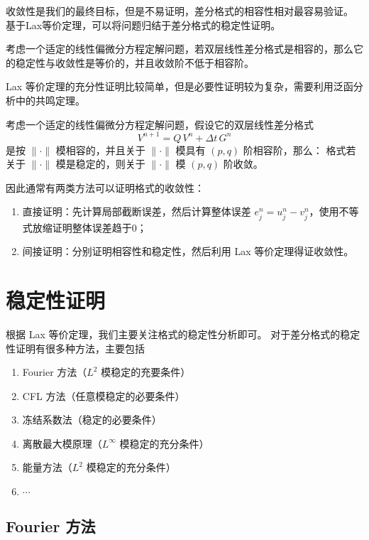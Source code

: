 收敛性是我们的最终目标，但是不易证明，差分格式的相容性相对最容易验证。
基于Lax等价定理，可以将问题归结于差分格式的稳定性证明。

\begin{theorem}
    考虑一个适定的线性偏微分方程定解问题，若双层线性差分格式是相容的，那么它的稳定性与收敛性是等价的，并且收敛阶不低于相容阶。
\end{theorem}

\begin{remark}
    Lax 等价定理的充分性证明比较简单，但是必要性证明较为复杂，需要利用泛函分析中的共鸣定理。
\end{remark}

\begin{theorem}[Lax 定理]
    考虑一个适定的线性偏微分方程定解问题，假设它的双层线性差分格式
    \[
        V^{n+1} = Q \,V^n +\Delta t \,G^n
    \]
    是按 $\|\cdot\|$ 模相容的，并且关于 $\|\cdot\|$ 模具有 $(p,q)$ 阶相容阶，那么：
    格式若关于 $\|\cdot\|$ 模是稳定的，则关于 $\|\cdot\|$ 模 $(p,q)$ 阶收敛。
\end{theorem}

因此通常有两类方法可以证明格式的收敛性：
\begin{enumerate}
    \item 直接证明：先计算局部截断误差，然后计算整体误差 $e_j^n = u_j^n - v_j^n$，使用不等式放缩证明整体误差趋于0；
    \item 间接证明：分别证明相容性和稳定性，然后利用 Lax 等价定理得证收敛性。
\end{enumerate}

\section{稳定性证明}

根据 Lax 等价定理，我们主要关注格式的稳定性分析即可。
对于差分格式的稳定性证明有很多种方法，主要包括
\begin{enumerate}
    \item Fourier 方法（$L^2$ 模稳定的充要条件）
    \item CFL 方法（任意模稳定的必要条件）
    \item 冻结系数法（稳定的必要条件）
    \item 离散最大模原理（$L^\infty$ 模稳定的充分条件）
    \item 能量方法（$L^2$ 模稳定的充分条件）
    \item[] $\cdots$
\end{enumerate}


\subsection{Fourier 方法}

